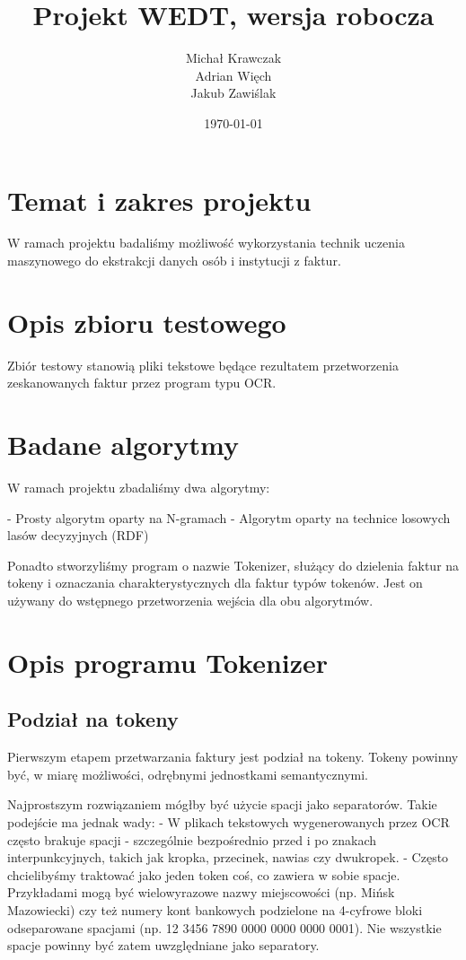 \documentclass[a4paper,oneside,12pt]{article}
\title{Projekt WEDT, wersja robocza}
\author{
	Michał Krawczak \\
	Adrian Więch \\
	Jakub Zawiślak
}
\date{\today}
\begin{document}
\maketitle
\newpage
\tableofcontents
\newpage

\setlength\parindent{0pt}
\setlength{\parskip}{0.25em}

\section{Temat i zakres projektu}

W ramach projektu badaliśmy możliwość wykorzystania technik uczenia maszynowego do ekstrakcji danych osób i instytucji z faktur.

\section{Opis zbioru testowego}

Zbiór testowy stanowią pliki tekstowe będące rezultatem przetworzenia zeskanowanych faktur przez program typu OCR.

\section{Badane algorytmy}

W ramach projektu zbadaliśmy dwa algorytmy:

- Prosty algorytm oparty na N-gramach
- Algorytm oparty na technice losowych lasów decyzyjnych (RDF)

Ponadto stworzyliśmy program o nazwie Tokenizer, służący do dzielenia faktur na tokeny i oznaczania charakterystycznych dla faktur typów tokenów. Jest on używany do wstępnego przetworzenia wejścia dla obu algorytmów.

\section{Opis programu Tokenizer}

\subsection{Podział na tokeny}

Pierwszym etapem przetwarzania faktury jest podział na tokeny. Tokeny powinny być, w miarę możliwości, odrębnymi jednostkami semantycznymi. 

Najprostszym rozwiązaniem mógłby być użycie spacji jako separatorów. Takie podejście ma jednak wady:
- W plikach tekstowych wygenerowanych przez OCR często brakuje spacji - szczególnie bezpośrednio przed i po znakach interpunkcyjnych, takich jak kropka, przecinek, nawias czy dwukropek. 
- Często chcielibyśmy traktować jako jeden token coś, co zawiera w sobie spacje. Przykładami mogą być wielowyrazowe nazwy miejscowości (np. Mińsk Mazowiecki) czy też numery kont bankowych podzielone na 4-cyfrowe bloki odseparowane spacjami (np. 12 3456 7890 0000 0000 0000 0001). Nie wszystkie spacje powinny być zatem uwzględniane jako separatory.
\end{document}
